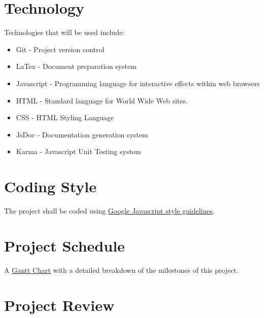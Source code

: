 \documentclass{article}
\begin{document}
\section{Technology}
Technologies that will be used include:

\begin{itemize}

  \item Git - Project version control
  \item LaTex - Document preparation system
  \item Javascript - Programming language for interactive effects within web browsers
  \item HTML - Standard language for World Wide Web sites.
  \item CSS - HTML Styling Language 
  \item JsDoc - Documentation generation system
  \item Karma - Javascript Unit Testing system 

\end{itemize}

\section{Coding Style}
The project shall be coded using \href{https://google.github.io/styleguide/javascriptguide.xml}
{Google Javascript style guidelines}.

\section{Project Schedule}

A \href{run:../../ProjectSchedule/Gantt Chart.gan}{Gantt Chart} with a detailed breakdown of the milestones of this project.

\section{Project Review}
\end{document}
